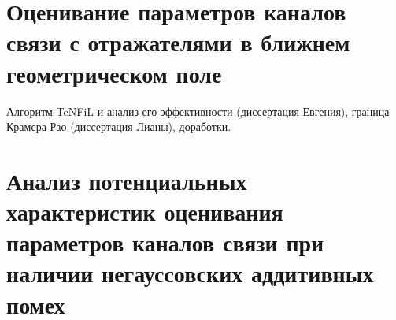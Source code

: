 \section{Оценивание параметров каналов связи с отражателями в ближнем геометрическом поле}\label{ch:ch2/sec2}

Алгоритм TeNFiL и анализ его эффективности (диссертация Евгения), граница Крамера-Рао (диссертация Лианы), доработки.

\section{Анализ потенциальных характеристик оценивания параметров каналов связи при наличии негауссовских аддитивных помех}\label{ch:ch2/sec3}

\begin{comment}
Результаты данного раздела доклада были опубликованы в \cite{vakbib1}.

Планомерно растущие вычислительные способности программно-аппаратных комплексов обработки цифровых сигналов позволяют рассматривать всё более сложные модели данных и распределения аддитивных помех. Усложнение моделей задач, помимо повышения требований к вычислительным ресурсам, также несёт в себе потенциал для улучшения качественных показателей систем использующих цифровую обработку сигналов.

Задача оценивания направлений прихода заданного числа сигналов имеет множество приложений в области радиолокации и коммуникаций, а также, ввиду абстрактности и общеприменимости постановки, в сейсмологии, акустике, ультразвуковых измерениях. 

Задача имеет богатую историю в отечественной \cite{TrifShin1986, ManGel2015} и зарубежной \cite{Capon1969} литературе и продолжает оставаться актуальной. Аналитическое решение задачи отсутствует в литературе, поэтому распространение получили эвристические и численные методы решения. Среди первых стоит выделить класс методов подпространства сигналов \cite{Schmidt1986, Roy1989}, использующих спектральные разложения оценок пространственных ковариационных матриц. Для поиска оптимального решения зачастую применяются численные методы, такие как алгоритм IQML \cite{Bresler1985, Bresler1986}, итеративно максимизирующий функцию правдоподобия выборки, а также алгоритмы-производные от алгоритма EM, такие как MODE \cite{Stoica1990}. С точки зрения негауссовских аддитивных помех в литературе рассмотрен случай импульсного аддитивного шума, заданного смесью двух Гауссовских распределений с разными ковариациями \cite{Kozick2000, Kozick2000b}. Другой класс численных методов итеративно ищет оценку подпространства сигналов \cite{Ziskind1988, Bazzi2018}.


\end{comment}

